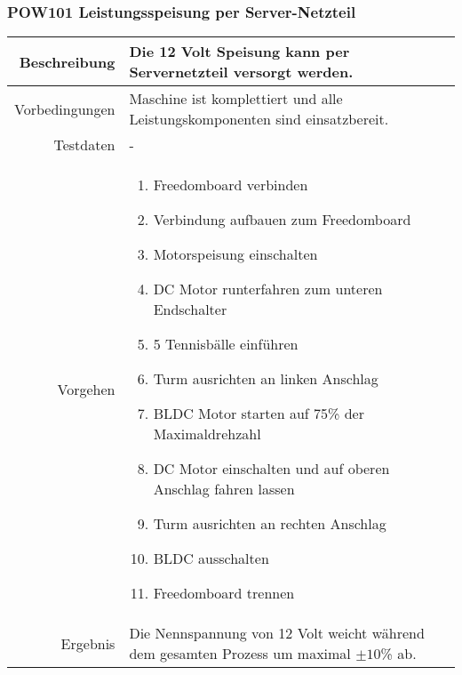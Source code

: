 \subsubsection{POW101 Leistungsspeisung per Server-Netzteil}
\begin{table}[h!]
	\renewcommand{\arraystretch}{1.5}
	\begin{tabular}{|r|p{14cm}|}
		\hline Beschreibung	&
			Die 12 Volt Speisung kann per Servernetzteil versorgt werden. \\ 
		\hline Vorbedingungen	&
			Maschine ist komplettiert und alle Leistungskomponenten
			sind einsatzbereit. \\ 
		\hline Testdaten	& - \\ 
		\hline Vorgehen		& 
		\begin{enumerate}
			\item Freedomboard verbinden
			\item Verbindung aufbauen zum Freedomboard
			\item Motorspeisung einschalten
			\item DC Motor runterfahren zum unteren Endschalter
			\item 5 Tennisbälle einführen
			\item Turm ausrichten an linken Anschlag
			\item BLDC Motor starten auf 75\% der Maximaldrehzahl
			\item DC Motor einschalten und auf oberen Anschlag fahren lassen
			\item Turm ausrichten an rechten Anschlag
			\item BLDC ausschalten
			\item Freedomboard trennen
		\end{enumerate} \\ 
		\hline Ergebnis 	&
			Die Nennspannung von 12 Volt weicht während dem gesamten
			Prozess um maximal $\pm10$\% ab. \\ 
		\hline 
	\end{tabular}
\end{table}

\newpage

